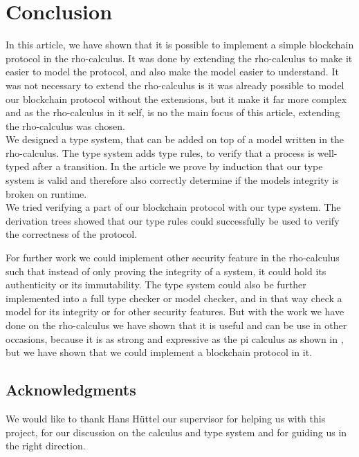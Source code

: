 \section{Conclusion}

In this article, we have shown that it is possible to implement a simple blockchain protocol in the rho-calculus. It was done by extending the rho-calculus to make it easier to model the protocol, and also make the model easier to understand. It was not necessary to extend the rho-calculus is it was already possible to model our blockchain protocol without the extensions, but it make it far more complex and as the rho-calculus in it self, is no the main focus of this article, extending the rho-calculus was chosen.\\
We designed a type system, that can be added on top of a model written in the rho-calculus. The type system adds type rules, to verify that a process is well-typed after a transition. In the article we prove by induction that our type system is valid and therefore also correctly determine if the models integrity is broken on runtime.\\
We tried verifying a part of our blockchain protocol with our type system. The derivation trees showed that our type rules could successfully be used to verify the correctness of the protocol.

For further work we could implement other security feature in the rho-calculus such that instead of only proving the integrity of a system, it could hold its authenticity or its immutability. The type system could also be further implemented into a full type checker or model checker, and in that way check a model for its integrity or for other security features. But with the work we have done on the rho-calculus we have shown that it is useful and can be use in other occasions, because it is as strong and expressive as the pi calculus as shown in \citep{Meredith2005}, but we have shown that we could implement a blockchain protocol in it.





\subsection*{Acknowledgments}
We would like to thank Hans Hüttel our supervisor for helping us with this project, for our discussion on the calculus and type system and for guiding us in the right direction.
